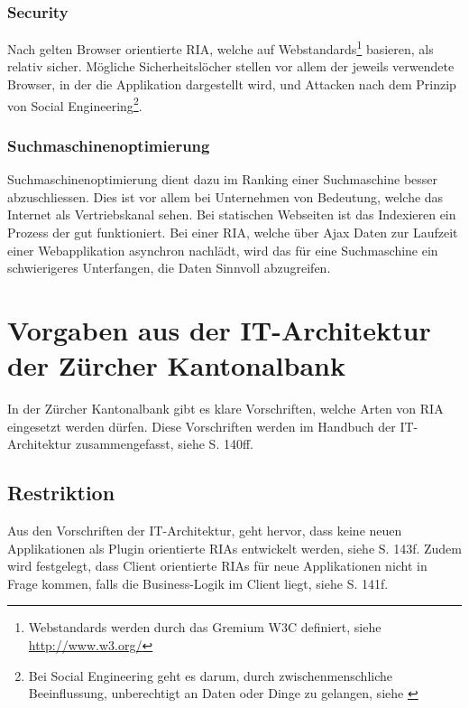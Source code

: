   \subsubsection{Security}
  
  Nach \cite{RichInternetApplication} gelten Browser orientierte \ac{RIA},
  welche auf Webstandards\footnote{Webstandards werden durch das Gremium W3C
  definiert, siehe \url{http://www.w3.org/}} basieren, als relativ sicher.
  Mögliche Sicherheitslöcher stellen vor allem der jeweils verwendete Browser,
  in der die Applikation dargestellt wird, und Attacken nach dem Prinzip von
  Social Engineering\footnote{Bei Social Engineering geht es darum, durch
  zwischenmenschliche Beeinflussung, unberechtigt an Daten oder Dinge zu
  gelangen, siehe \cite{SocialEngineering}}.
  
  \subsubsection{Suchmaschinenoptimierung}
  
  Suchmaschinenoptimierung dient dazu im Ranking einer Suchmaschine besser
  abzuschliessen. Dies ist vor allem bei Unternehmen von Bedeutung, welche das
  Internet als Vertriebskanal sehen. Bei statischen Webseiten ist das Indexieren
  ein Prozess der gut funktioniert. Bei einer \ac{RIA}, welche über \ac{Ajax}
  Daten zur Laufzeit einer Webapplikation asynchron nachlädt, wird das für eine
  Suchmaschine ein schwierigeres Unterfangen, die Daten Sinnvoll abzugreifen.
  
  \section{Vorgaben aus der IT-Architektur der Zürcher Kantonalbank}
  
  In der Zürcher Kantonalbank gibt es klare Vorschriften, welche Arten von
  \ac{RIA} eingesetzt werden dürfen. Diese Vorschriften werden im Handbuch der
  IT-Architektur zusammengefasst, siehe \cite{ZkbHandbuchDerItArchitektur} S.
  140ff. 
  
  \subsection{Restriktion}
  
  Aus den Vorschriften der IT-Architektur, geht hervor, dass keine neuen
  Applikationen als Plugin orientierte \acp{RIA} entwickelt werden, siehe
  \cite{ZkbHandbuchDerItArchitektur} S. 143f. Zudem wird festgelegt, dass
  Client orientierte \acp{RIA} für neue Applikationen nicht in Frage kommen,
  falls die Business-Logik im Client liegt, siehe
  \cite{ZkbHandbuchDerItArchitektur} S. 141f.
  
